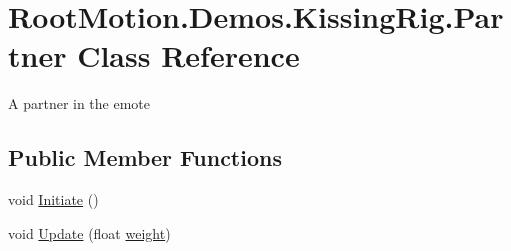\hypertarget{class_root_motion_1_1_demos_1_1_kissing_rig_1_1_partner}{}\section{Root\+Motion.\+Demos.\+Kissing\+Rig.\+Partner Class Reference}
\label{class_root_motion_1_1_demos_1_1_kissing_rig_1_1_partner}


A partner in the emote  


\subsection*{Public Member Functions}
\begin{DoxyCompactItemize}
\item 
void \mbox{\hyperlink{class_root_motion_1_1_demos_1_1_kissing_rig_1_1_partner_ae3787ff36f970459204a89e47cd7f2f8}{Initiate}} ()
\item 
void \mbox{\hyperlink{class_root_motion_1_1_demos_1_1_kissing_rig_1_1_partner_a834db5a2288aaa43f9ae32be1350edef}{Update}} (float \mbox{\hyperlink{class_root_motion_1_1_demos_1_1_kissing_rig_a687c2a0ee27e71c487681e4f81eb41c7}{weight}})
\end{DoxyCompactItemize}
